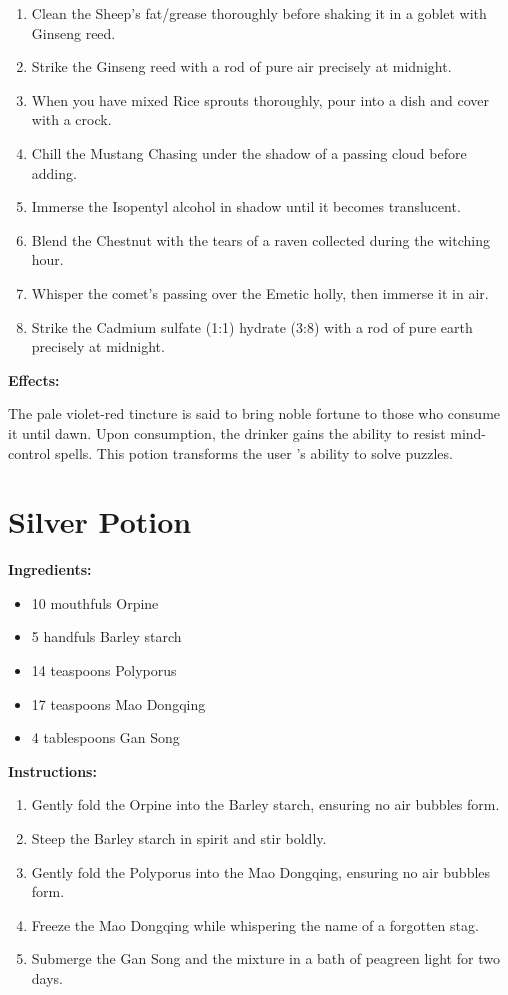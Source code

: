 \documentclass{article}
\begin{document}
\begin{enumerate}
  \item Clean the Sheep's fat/grease thoroughly before shaking it in a goblet with Ginseng reed.
  \item Strike the Ginseng reed with a rod of pure air precisely at midnight.
  \item When you have mixed Rice sprouts thoroughly, pour into a dish and cover with a crock.
  \item Chill the Mustang Chasing under the shadow of a passing cloud before adding.
  \item Immerse the Isopentyl alcohol in shadow until it becomes translucent.
  \item Blend the Chestnut with the tears of a raven collected during the witching hour.
  \item Whisper the comet’s passing over the Emetic holly, then immerse it in air.
  \item Strike the Cadmium sulfate (1:1) hydrate (3:8) with a rod of pure earth precisely at midnight.
\end{enumerate}

\textbf{Effects:}

The pale violet-red tincture is said to bring noble fortune to those who consume it until dawn. Upon consumption, the drinker gains the ability to resist mind- control spells. This potion transforms the user 's ability to solve puzzles.

\newpage
\section*{Silver Potion}

\textbf{Ingredients:}

\begin{itemize}
  \item 10 mouthfuls Orpine
  \item 5 handfuls Barley starch
  \item 14 teaspoons Polyporus
  \item 17 teaspoons Mao Dongqing
  \item 4 tablespoons Gan Song
\end{itemize}

\textbf{Instructions:}

\begin{enumerate}
  \item Gently fold the Orpine into the Barley starch, ensuring no air bubbles form.
  \item Steep the Barley starch in spirit and stir boldly.
  \item Gently fold the Polyporus into the Mao Dongqing, ensuring no air bubbles form.
  \item Freeze the Mao Dongqing while whispering the name of a forgotten stag.
  \item Submerge the Gan Song and the mixture in a bath of peagreen light for two days.
\end{enumerate}
\end{document}
